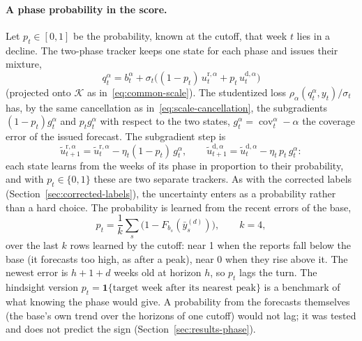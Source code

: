 \documentclass[11pt,a4paper]{article}
\newcommand{\K}{\mathcal{K}}
\newcommand{\ind}{\mathbf{1}}
\DeclareMathOperator{\cov}{cov}
\theoremstyle{definition}
\theoremstyle{remark}
\begin{document}
\paragraph{A phase probability in the score.} Let $p_t\in[0,1]$ be the
probability, known at the cutoff, that week $t$ lies in a decline. The
two-phase tracker keeps one state for each phase and issues their mixture,
\begin{equation}
 q_t^\alpha=b_t^\alpha+\sigma_t\bigl((1-p_t)\,u_t^{\mathrm r,\alpha}
 +p_t\,u_t^{\mathrm d,\alpha}\bigr)
 \label{eq:two-phase-forecast}
\end{equation}
(projected onto $\K$ as in~\eqref{eq:common-scale}). The studentized loss
$\rho_\alpha(q_t^\alpha,y_t)/\sigma_t$ has, by the same cancellation as
in~\eqref{eq:scale-cancellation}, the subgradients $(1-p_t)g_t^\alpha$ and
$p_tg_t^\alpha$ with respect to the two states, $g_t^\alpha=\cov_t^\alpha-\alpha$
the coverage error of the issued forecast. The subgradient step is
\begin{equation}
 \tilde u_{t+1}^{\mathrm r,\alpha}=\tilde u_t^{\mathrm r,\alpha}-\eta_t(1-p_t)\,g_t^\alpha,
 \qquad
 \tilde u_{t+1}^{\mathrm d,\alpha}=\tilde u_t^{\mathrm d,\alpha}-\eta_t\,p_t\,g_t^\alpha:
 \label{eq:two-phase-update}
\end{equation}
each state learns from the weeks of its phase in proportion to their
probability, and with $p_t\in\{0,1\}$ these are two separate trackers. As
with the corrected labels (Section~\ref{sec:corrected-labels}), the
uncertainty enters as a probability rather than a hard choice. The
probability is learned from the recent errors of the base,
\begin{equation}
 p_t=\frac1k\sum_{s}\bigl(1-F_{b_s}(\bar y_s^{(d)})\bigr),\qquad k=4,
 \label{eq:decline-probability}
\end{equation}
over the last $k$ rows learned by the cutoff: near 1 when the reports fall
below the base (it forecasts too high, as after a peak), near 0 when they
rise above it. The newest error is $h+1+d$ weeks old at horizon $h$, so
$p_t$ lags the turn. The hindsight version $p_t=\ind\{\text{target week
after its nearest peak}\}$ is a benchmark of what knowing the phase would
give. A probability from the forecasts themselves (the base's own trend
over the horizons of one cutoff) would not lag; it was tested and does not
predict the sign (Section~\ref{sec:results-phase}).
\end{document}
